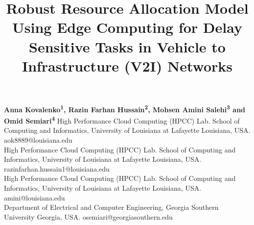 \documentclass[11pt,a4paper]{article}
\title{Robust Resource Allocation Model Using Edge Computing for Delay Sensitive Tasks in Vehicle to Infrastructure (V2I) Networks}
\date{}
\begin{document}
\maketitle
{}
\newcommand{\ie}{\textit{i}.\textit{e}.,}
\newcommand{\eg}{\textit{e}.\textit{g}.,}
\newcommand{\bs}{\text{Base Station}}

\begin{center}
\textbf{Anna Kovalenko\textsuperscript{1}, Razin Farhan Hussain\textsuperscript{2}, Mohsen Amini Salehi\textsuperscript{3} and Omid Semiari\textsuperscript{4}}
\small{High Performance Cloud Computing (HPCC) Lab. School of Computing and Informatics, University of Louisiana at Lafayette Louisiana, USA. aok8889@louisiana.edu} \\
\small{High Performance Cloud Computing (HPCC) Lab. School of Computing and Informatics, University of Louisiana at Lafayette Louisiana, USA. razinfarhan.hussain1@louisiana.edu} \\
\small{High Performance Cloud Computing (HPCC) Lab. School of Computing and Informatics, University of Louisiana at Lafayette Louisiana, USA. amini@louisiana.edu} \\
\small{Department of Electrical and Computer Engineering, Georgia Southern University Georgia, USA. osemiari@georgiasouthern.edu}
\end{center}
\end{document}
